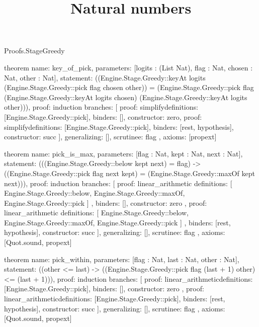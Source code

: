 \begin{lexlean}{Proofs.StageGreedy}
\title{Natural numbers}
\begin{semanticmodule}
theorem{
  name: key_of_pick,
  parameters: [logits : (List Nat), flag : Nat, chosen : Nat, other : Nat],
  statement: ((Engine.Stage.Greedy::keyAt logits (Engine.Stage.Greedy::pick flag chosen other)) = (Engine.Stage.Greedy::pick flag (Engine.Stage.Greedy::keyAt logits chosen) (Engine.Stage.Greedy::keyAt logits other))),
  proof: induction{
    branches: [
      {proof: simplify{definitions: [Engine.Stage.Greedy::pick]}, binders: [], constructor: zero},
      {
        proof: simplify{definitions: [Engine.Stage.Greedy::pick]},
        binders: [rest, hypothesis],
        constructor: succ
      }
    ],
    generalizing: [],
    scrutinee: flag
  },
  axioms: [propext]
}

theorem{
  name: pick_is_max,
  parameters: [flag : Nat, kept : Nat, next : Nat],
  statement: (((Engine.Stage.Greedy::below kept next) = flag) -> ((Engine.Stage.Greedy::pick flag next kept) = (Engine.Stage.Greedy::maxOf kept next))),
  proof: induction{
    branches: [
      {
        proof: linear_arithmetic{
          definitions: [
            Engine.Stage.Greedy::below,
            Engine.Stage.Greedy::maxOf,
            Engine.Stage.Greedy::pick
          ]
        },
        binders: [],
        constructor: zero
      },
      {
        proof: linear_arithmetic{
          definitions: [
            Engine.Stage.Greedy::below,
            Engine.Stage.Greedy::maxOf,
            Engine.Stage.Greedy::pick
          ]
        },
        binders: [rest, hypothesis],
        constructor: succ
      }
    ],
    generalizing: [],
    scrutinee: flag
  },
  axioms: [Quot.sound, propext]
}

theorem{
  name: pick_within,
  parameters: [flag : Nat, last : Nat, other : Nat],
  statement: ((other <= last) -> ((Engine.Stage.Greedy::pick flag (last + 1) other) <= (last + 1))),
  proof: induction{
    branches: [
      {
        proof: linear_arithmetic{definitions: [Engine.Stage.Greedy::pick]},
        binders: [],
        constructor: zero
      },
      {
        proof: linear_arithmetic{definitions: [Engine.Stage.Greedy::pick]},
        binders: [rest, hypothesis],
        constructor: succ
      }
    ],
    generalizing: [],
    scrutinee: flag
  },
  axioms: [Quot.sound, propext]
}


\end{semanticmodule}
\end{lexlean}
